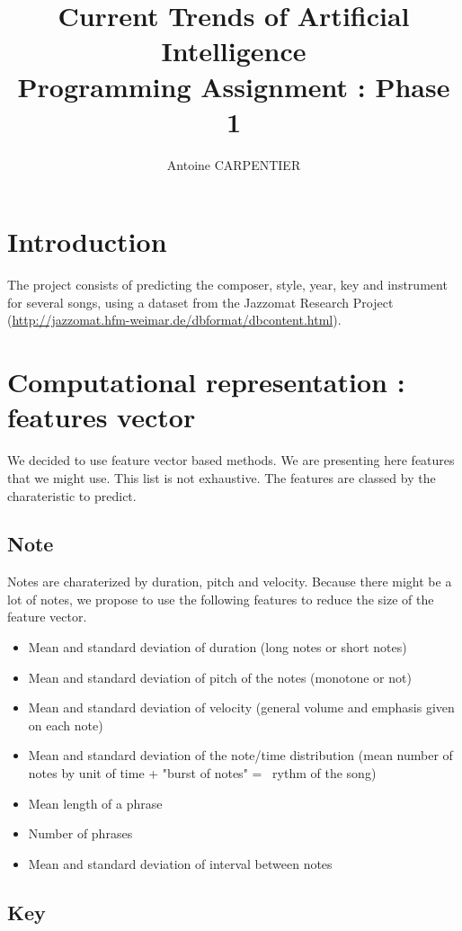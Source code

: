 \documentclass[a4paper,12pt]{article}
\author{Antoine CARPENTIER}
\title{Current Trends of Artificial Intelligence\\ \small Programming Assignment : Phase 1}
\begin{document}
\maketitle

\section{Introduction}

The project consists of predicting the composer, style, year, key and instrument for several songs, using a dataset from the Jazzomat Research Project (\url{http://jazzomat.hfm-weimar.de/dbformat/dbcontent.html}).

\section{Computational representation : features vector}

We decided to use feature vector based methods. We are presenting here features that we might use. This list is not exhaustive. The features are classed by the charateristic to predict.

\subsection{Note}

Notes are charaterized by duration, pitch and velocity. Because there might be a lot of notes, we propose to use the following features to reduce the size of the feature vector.

\begin{itemize}
    \item Mean and standard deviation of duration (long notes or short notes)
    \item Mean and standard deviation of pitch of the notes (monotone or not)
    \item Mean and standard deviation of velocity (general volume and emphasis given on each note)
    \item Mean and standard deviation of the note/time distribution (mean number of notes by unit of time + "burst of notes" =~ rythm of the song) 
    \item Mean length of a phrase
    \item Number of phrases
    \item Mean and standard deviation of interval between notes
\end{itemize}

\subsection{Key}
\end{document}
